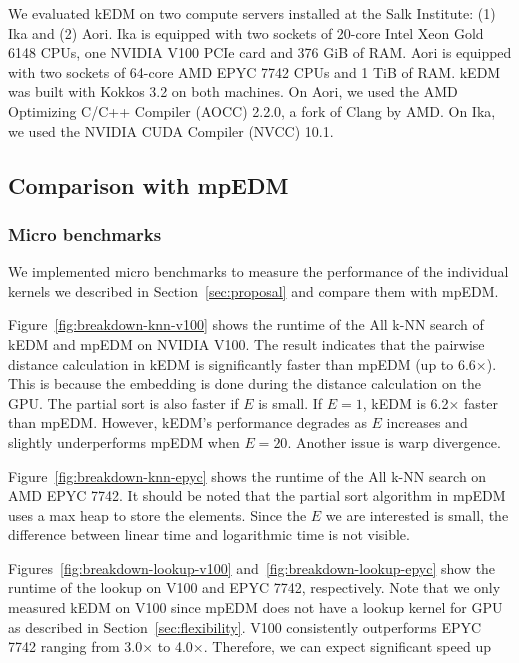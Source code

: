 \documentclass[conference]{IEEEtran}
\begin{document}

We evaluated kEDM on two compute servers installed at the Salk Institute: (1)
Ika and (2) Aori. Ika is equipped with two sockets of 20-core Intel Xeon Gold
6148 CPUs, one NVIDIA V100 PCIe card and 376 GiB of RAM\@. Aori is equipped with
two sockets of 64-core AMD EPYC 7742 CPUs and 1 TiB of RAM\@. kEDM was built
with Kokkos 3.2 on both machines. On Aori, we used the AMD Optimizing C/C++
Compiler (AOCC) 2.2.0, a fork of Clang by AMD. On Ika, we used the NVIDIA CUDA
Compiler (NVCC) 10.1.

\subsection{Comparison with mpEDM}

\subsubsection{Micro benchmarks}

We implemented micro benchmarks to measure the performance of the individual
kernels we described in Section~\ref{sec:proposal} and compare them with
mpEDM\@.

Figure~\ref{fig:breakdown-knn-v100} shows the runtime of the All k-NN search
of kEDM and mpEDM on NVIDIA V100. The result indicates that the pairwise
distance calculation in kEDM is significantly faster than mpEDM (up to
6.6$\times$). This is because the embedding is done during the distance
calculation on the GPU\@. The partial sort is also faster if $E$ is small. If
$E=1$, kEDM is 6.2$\times$ faster than mpEDM\@. However, kEDM's performance
degrades as $E$ increases and slightly underperforms mpEDM when $E=20$.
Another issue is warp divergence.

Figure~\ref{fig:breakdown-knn-epyc} shows the runtime of the All k-NN search
on AMD EPYC 7742. It should be noted that the partial sort algorithm in mpEDM
uses a max heap to store the elements. Since the $E$ we are interested is
small, the difference between linear time and logarithmic time is not visible.

Figures~\ref{fig:breakdown-lookup-v100} and~\ref{fig:breakdown-lookup-epyc}
show the runtime of the lookup on V100 and EPYC 7742, respectively. Note that
we only measured kEDM on V100 since mpEDM does not have a lookup kernel for
GPU as described in Section~\ref{sec:flexibility}. V100 consistently
outperforms EPYC 7742 ranging from 3.0$\times$ to 4.0$\times$. Therefore, we
can expect significant speed up
\end{document}
